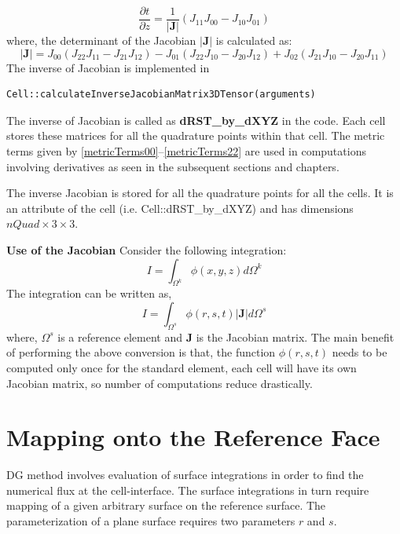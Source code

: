 \begin{equation}\label{metricTerms22}
	\frac{\partial t}{\partial z} = \frac{1}{|{\mathbf{J}}|} \left( J_{11}J_{00} - J_{10}J_{01}\right)
\end{equation}
where, the determinant of the Jacobian $|{\mathbf{J}}|$ is calculated as:
\begin{equation}\label{detJ}
	|{\mathbf{J}}| = J_{00} (J_{22}J_{11} - J_{21}J_{12}) - J_{01} (J_{22}J_{10} - J_{20}J_{12})  + J_{02} (J_{21}J_{10} - J_{20}J_{11}) 
\end{equation}
The inverse of Jacobian is implemented in 
\begin{verbatim} 
Cell::calculateInverseJacobianMatrix3DTensor(arguments) 
\end{verbatim}

\begin{note}
	The inverse of Jacobian is called as {\bf dRST\_by\_dXYZ} in the code. Each cell stores these matrices for all the quadrature
	points within that cell. The metric terms given by \ref{metricTerms00}--\ref{metricTerms22} 
	are used in computations involving derivatives as seen in the subsequent sections and chapters.
\end{note}
The inverse Jacobian is stored for all the quadrature points for all the cells. It is an attribute of the cell
(i.e. Cell::dRST\_by\_dXYZ) and has dimensions $nQuad \times 3 \times 3$.

{\bf Use of the Jacobian}
Consider the following integration:
\begin{equation}\label{J_example}
	I = \int_{\Omega^k} \phi(x,y,z) d\Omega^k
\end{equation}
The integration can be written as,
\begin{equation}
	I = \int_{\Omega^s} \phi(r,s,t) |\mathbf{J}| d\Omega^s
\end{equation}
where, $\Omega^s$ is a reference element and $\mathbf{J}$ is the Jacobian matrix.
The main benefit of performing the above conversion is that, the function $\phi(r,s,t)$ needs to be computed only once
for the standard element, each cell will have its own Jacobian matrix, so number of computations reduce drastically.


\section{Mapping onto the Reference Face}
DG method involves evaluation of surface integrations in order to find the numerical flux at the cell-interface.
The surface integrations in turn require mapping of a given arbitrary surface on the reference surface.
The parameterization of a plane surface requires two parameters $r$ and $s$. 

